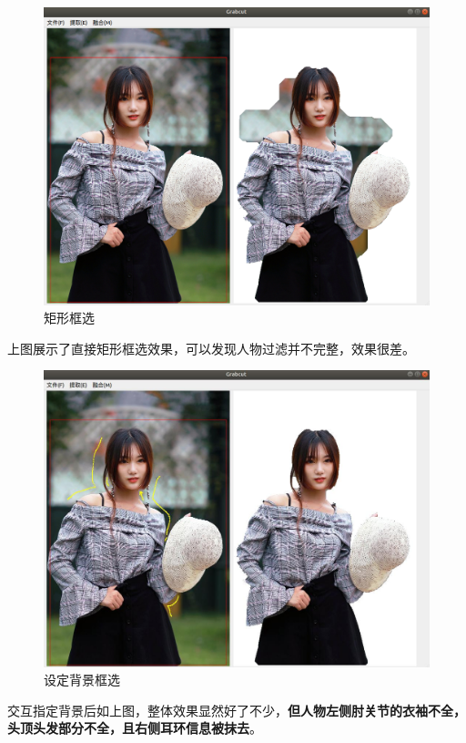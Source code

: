 \documentclass[12pt]{article}
\begin{document}
	\begin{figure}[H]
		\centering
		\includegraphics[width=5in]{./2_1.png}
		\centering
		\caption{矩形框选}
	\end{figure}
	上图展示了直接矩形框选效果，可以发现人物过滤并不完整，效果很差。
	
	\begin{figure}[H]
		\centering
		\includegraphics[width=5in]{./2_2.png}
		\centering
		\caption{设定背景框选}
	\end{figure}
	交互指定背景后如上图，整体效果显然好了不少，\textbf{但人物左侧肘关节的衣袖不全，头顶头发部分不全，且右侧耳环信息被抹去}。
	
\end{document}
